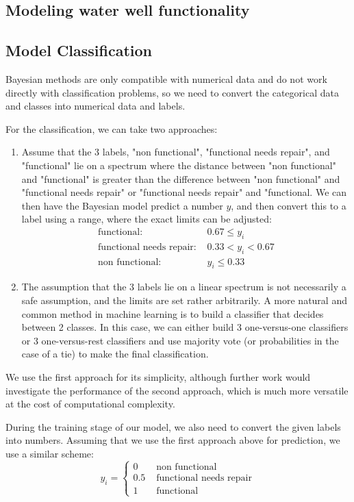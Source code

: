\documentclass{article} %
\begin{document}
\begin{multicols}{2}
\section{Modeling water well functionality}

\subsection{Model Classification}

Bayesian methods are only compatible with numerical data and do not work directly with classification problems, so we need to convert the categorical data and classes into numerical data and labels.

For the classification, we can take two approaches:
\begin{enumerate}
\item Assume that the 3 labels, "non functional", "functional needs repair", and "functional" lie on a spectrum where the distance between "non functional" and "functional" is greater than the difference between "non functional" and "functional needs repair" or "functional needs repair" and "functional. We can then have the Bayesian model predict a number $y$, and then convert this to a label using a range, where the exact limits can be adjusted:
\begin{align*}
\text{functional: } & 0.67\leq y_i \\
\text{functional needs repair: } & 0.33<y_i<0.67 \\
\text{non functional: } &  y_i \leq 0.33
\end{align*}
\item The assumption that the 3 labels lie on a linear spectrum is not necessarily a safe assumption, and the limits are set rather arbitrarily. A more natural and common method in machine learning is to build a classifier that decides between 2 classes. In this case, we can either build 3 one-versus-one classifiers or 3 one-versus-rest classifiers and use majority vote (or probabilities in the case of a tie) to make the final classification.
\end{enumerate}

We use the first approach for its simplicity, although further work would investigate the performance of the second approach, which is much more versatile at the cost of computational complexity.

During the training stage of our model, we also need to convert the given labels into numbers. Assuming that we use the first approach above for prediction, we use a similar scheme:
\begin{equation*}
y_i = 
\begin{cases}
0 & \text{ non functional}\\
0.5 & \text{ functional needs repair}\\
1 & \text{ functional}
\end{cases}
\end{equation*}


\end{multicols}
\end{document}
